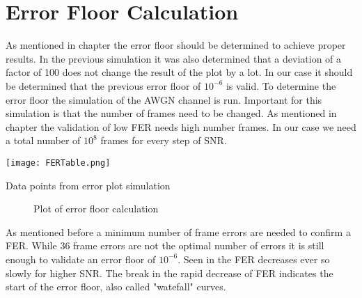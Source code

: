 \section{Error Floor Calculation}
As mentioned in chapter  the error floor should be determined to achieve proper results. In the previous simulation it was also determined that a deviation of a factor of 100 does not change the result of the plot by a lot. 
In our case it should be determined that the previous error floor of $10^{-6}$ is valid. 
\newline
To determine the error floor the simulation of the \gls{AWGN} channel is run. Important for this simulation is that the number of frames need to be changed. As mentioned in chapter  the validation of low \gls{FER} needs high number frames. In our case we need a total number of $10^{8}$ frames for every step of SNR.
\begin{table}[!htb]
	\centering
	\texttt{[image: FERTable.png]}
	\caption{Data points from error plot simulation}
	\label{fig:ErrorTable}
\end{table}
\begin{figure}[!htb]
	\setlength{}
	\setlength\fheight{0.4\textheight}
	\centering
	
	\caption{Plot of error floor calculation}
	\label{fig:ErrorFloor}
\end{figure}
As mentioned before a minimum number of frame errors are needed to confirm a \gls{FER}. While 36 frame errors are not the optimal number of errors it is still enough to validate an error floor of $10^{-6}$.
Seen in  the \gls{FER} decreases ever so slowly for higher \gls{SNR}. The break in the rapid decrease of \gls{FER} indicates the start of the error floor, also called "watefall" curves\cite{Richardson}. 
 






\clearpage
